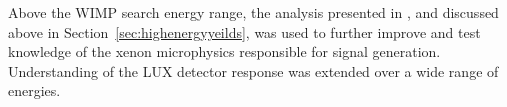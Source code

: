 Above the \ac{WIMP} search energy range, the analysis presented in \cite{LUX:YieldsAndRecombination}, and discussed above in Section~\ref{sec:highenergyyeilds}, was used to further improve and test knowledge of the xenon microphysics responsible for signal generation. Understanding of the \ac{LUX} detector response was extended over a wide range of energies.


